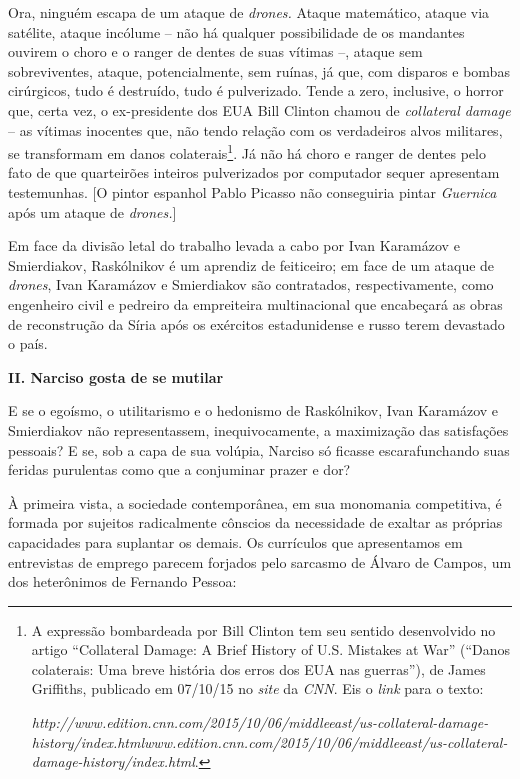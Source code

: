 Ora, ninguém escapa de um ataque de \emph{drones.} Ataque matemático,
ataque via satélite, ataque incólume -- não há qualquer possibilidade de
os mandantes ouvirem o choro e o ranger de dentes de suas vítimas --,
ataque sem sobreviventes, ataque, potencialmente, sem ruínas, já que,
com disparos e bombas cirúrgicos, tudo é destruído, tudo é pulverizado.
Tende a zero, inclusive, o horror que, certa vez, o ex-presidente dos
EUA Bill Clinton chamou de \emph{collateral damage} -- as vítimas
inocentes que, não tendo relação com os verdadeiros alvos militares, se
transformam em danos colaterais\footnote{A expressão bombardeada por
  Bill Clinton tem seu sentido desenvolvido no artigo ``Collateral
  Damage: A Brief History of U.S. Mistakes at War'' (``Danos colaterais:
  Uma breve história dos erros dos EUA nas guerras''), de James
  Griffiths, publicado em 07/10/15 no \emph{site} da \emph{CNN}. Eis o
  \emph{link} para o texto:

  \emph{http://www.edition.cnn.com/2015/10/06/middleeast/us-collateral-damage-history/index.html}{\emph{www.edition.cnn.com/2015/10/06/middleeast/us-collateral-damage-history/index.html}}.}.
Já não há choro e ranger de dentes pelo fato de que quarteirões inteiros
pulverizados por computador sequer apresentam testemunhas. {[}O pintor
espanhol Pablo Picasso não conseguiria pintar \emph{Guernica} após um
ataque de \emph{drones.}{]}

Em face da divisão letal do trabalho levada a cabo por Ivan Karamázov e
Smierdiakov, Raskólnikov é um aprendiz de feiticeiro; em face de um
ataque de \emph{drones}, Ivan Karamázov e Smierdiakov são contratados,
respectivamente, como engenheiro civil e pedreiro da empreiteira
multinacional que encabeçará as obras de reconstrução da Síria após os
exércitos estadunidense e russo terem devastado o país.

\textbf{II. Narciso gosta de se mutilar}

E se o egoísmo, o utilitarismo e o hedonismo de Raskólnikov, Ivan
Karamázov e Smierdiakov não representassem, inequivocamente, a
maximização das satisfações pessoais? E se, sob a capa de sua volúpia,
Narciso só ficasse escarafunchando suas feridas purulentas como que a
conjuminar prazer e dor?

À primeira vista, a sociedade contemporânea, em sua monomania
competitiva, é formada por sujeitos radicalmente cônscios da necessidade
de exaltar as próprias capacidades para suplantar os demais. Os
currículos que apresentamos em entrevistas de emprego parecem forjados
pelo sarcasmo de Álvaro de Campos, um dos heterônimos de Fernando
Pessoa:

